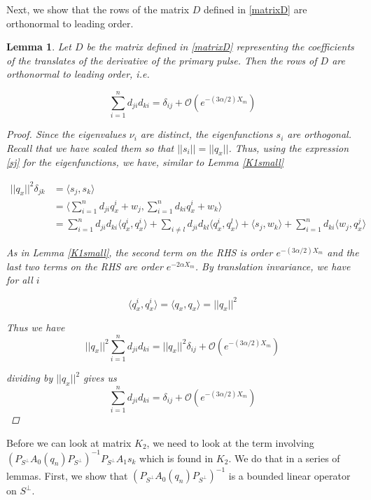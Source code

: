 \documentclass[12pt]{article}
\newtheorem{lemma}{Lemma}
\begin{document}
Next, we show that the rows of the matrix $D$ defined in \eqref{matrixD} are orthonormal to leading order.


\begin{lemma}\label{orthogonalD}
Let $D$ be the matrix defined in \eqref{matrixD} representing the coefficients of the translates of the derivative of the primary pulse. Then the rows of $D$ are orthonormal to leading order, i.e. 

\begin{equation}
\sum_{i = 1}^{n} d_{ji} d_{ki} = \delta_{ij} + \mathcal{O}(e^{-(3 \alpha/2) X_m})
\end{equation}

\begin{proof}
Since the eigenvalues $\nu_i$ are distinct, the eigenfunctions $s_i$ are orthogonal. Recall that we have scaled them so that $||s_i|| = ||q_x||$. Thus, using the expression \eqref{sj} for the eigenfunctions, we have, similar to Lemma \ref{K1small}

\begin{align*}
||q_x||^2 \delta_{jk} &= \langle s_j, s_k \rangle \\
&= \langle \sum_{i = 1}^{n} d_{ji} q^i_x + w_j, \sum_{i = 1}^{n} d_{ki} q^i_x + w_k\rangle \\
&= \sum_{i = 1}^{n} d_{ji} d_{ki} \langle q^i_x, q^i_{x} \rangle 
+ \sum_{i \neq l} d_{ji} d_{kl} \langle q^i_x, q^l_{x} \rangle 
+ \langle s_j, w_k \rangle 
+ \sum_{i = 1}^{n} d_{ki} \langle w_j, q^j_{x} \rangle
\end{align*}

As in Lemma \ref{K1small}, the second term on the RHS is order $e^{-(3 \alpha/2) X_m}$ and the last two terms on the RHS are order $e^{-2 \alpha X_m}$. By translation invariance, we have for all $i$

\[
\langle q^i_x, q^i_{x} \rangle = \langle q_x, q_{x} \rangle = ||q_x||^2
\]

Thus we have
\[
||q_x||^2 \sum_{i = 1}^{n} d_{ji} d_{ki} = ||q_x||^2 \delta_{ij} + \mathcal{O}(e^{-(3 \alpha / 2) X_m})
\]

dividing by $||q_x||^2$ gives us
\[
\sum_{i = 1}^{n} d_{ji} d_{ki} = \delta_{ij} + \mathcal{O}(e^{-(3 \alpha / 2) X_m})
\]

\end{proof}
\end{lemma}

Before we can look at matrix $K_2$, we need to look at the term involving $(P_{S^\perp} A_0(q_n) P_{S^\perp})^{-1} P_{S^\perp} A_1 s_k$ which is found in $K_2$. We do that in a series of lemmas. First, we show that $(P_{S^\perp} A_0(q_n) P_{S^\perp})^{-1}$ is a bounded linear operator on $S^\perp$.
\end{document}
